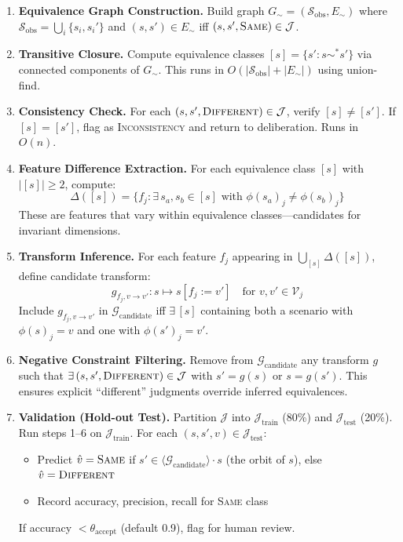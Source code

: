 \documentclass[12pt]{article}
\begin{document}
\begin{enumerate}
\item \textbf{Equivalence Graph Construction.} Build graph $G_\sim = (\mathcal{S}_{\text{obs}}, E_\sim)$ where $\mathcal{S}_{\text{obs}} = \bigcup_i \{s_i, s_i'\}$
and $(s, s') \in E_\sim$ iff $(s, s', \textsc{Same}) \in \mathcal{J}$.

\item \textbf{Transitive Closure.} Compute equivalence classes $[s] = \{s' : s \sim^* s'\}$ via connected components of $G_\sim$. This runs in $O(|\mathcal{S}_{\text{obs}}| + |E_\sim|)$ using union-find.

\item \textbf{Consistency Check.} For each $(s, s', \textsc{Different}) \in \mathcal{J}$, verify $[s] \neq [s']$. If $[s] = [s']$, flag as \textsc{Inconsistency} and return to deliberation. Runs in $O(n)$.

\item \textbf{Feature Difference Extraction.} For each equivalence class $[s]$ with $|[s]| \geq 2$, compute:
\[
\Delta([s]) = \{f_j : \exists\, s_a, s_b \in [s] \text{ with } \phi(s_a)_j \neq \phi(s_b)_j\}
\]
These are features that vary within equivalence classes---candidates for invariant dimensions.

\item \textbf{Transform Inference.} For each feature $f_j$ appearing in $\bigcup_{[s]} \Delta([s])$, define candidate transform:
\[
g_{f_j, v \to v'} : s \mapsto s[f_j := v'] \quad \text{for } v, v' \in \mathcal{V}_j
\]
Include $g_{f_j, v \to v'}$ in $\mathcal{G}_{\text{candidate}}$ iff $\exists\,[s]$ containing both a scenario with $\phi(s)_j = v$ and one with
$\phi(s')_j = v'$.

\item \textbf{Negative Constraint Filtering.} Remove from $\mathcal{G}_{\text{candidate}}$ any transform $g$ such that $\exists\,(s, s', \textsc{Different}) \in \mathcal{J}$ with $s' = g(s)$ or $s = g(s')$. This ensures explicit ``different'' judgments override inferred
equivalences.

\item \textbf{Validation (Hold-out Test).} Partition $\mathcal{J}$ into $\mathcal{J}_{\text{train}}$ (80\%) and $\mathcal{J}_{\text{test}}$ (20\%). Run steps
1--6 on $\mathcal{J}_{\text{train}}$. For each $(s, s', v) \in \mathcal{J}_{\text{test}}$:
\begin{itemize}
\item Predict $\hat{v} = \textsc{Same}$ if $s' \in \langle \mathcal{G}_{\text{candidate}} \rangle \cdot s$ (the orbit of $s$), else $\hat{v} = \textsc{Different}$
\item Record accuracy, precision, recall for \textsc{Same} class
\end{itemize}
If accuracy $< \theta_{\text{accept}}$ (default 0.9), flag for human review.


\end{enumerate}
\end{document}
